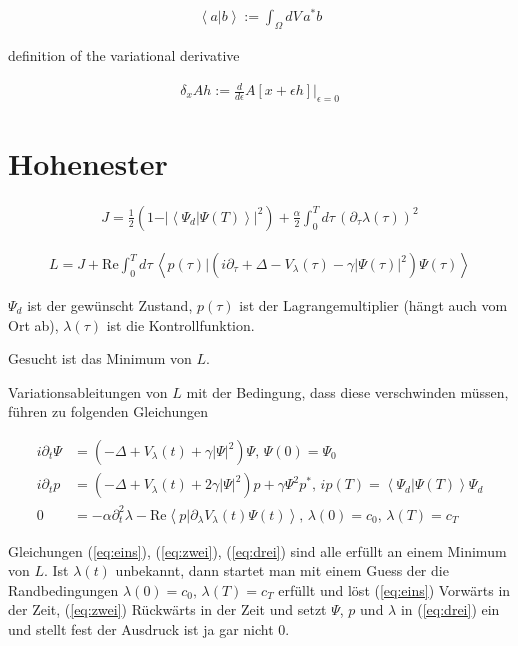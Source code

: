 \documentclass[10pt,a4paper]{article}
\newcommand{\iu}{\ensuremath{i}}
\newcommand{\intT}{\ensuremath{\int_0^T d\tau\,}}
\newcommand{\intV}{\ensuremath{\int_{\Omega} dV\,}}
\newcommand{\skalarprodukt}[2]{\left< #1 \vert #2 \right>}
\begin{document}
\begin{align}
\skalarprodukt{a}{b} := \intV a^* b
\end{align}


definition of the variational derivative

\begin{align}
\delta_x A h := \frac{d}{d\epsilon} A \left[ x+\epsilon h \right] \vert_{\epsilon=0}
\end{align}

\section{Hohenester}

\begin{align}
J = \frac{1}{2} \left(1 - \vert\skalarprodukt{\Psi_d}{\Psi(T)}\vert^2 \right) + \frac{\alpha}{2} \intT \left( \partial_{\tau} \lambda(\tau) \right)^2
\end{align}

\begin{align}
L = J + \text{Re} \intT \skalarprodukt{p(\tau)}{\left( \iu \partial_{\tau} + \Delta - V_{\lambda}(\tau) - \gamma \vert \Psi(\tau) \vert^2 \right)\Psi(\tau)}
\end{align}

$\Psi_d$ ist der gewünscht Zustand, $p(\tau)$ ist der Lagrangemultiplier (hängt auch vom Ort ab), $\lambda(\tau)$ ist die Kontrollfunktion.

Gesucht ist das Minimum von $L$.

Variationsableitungen von $L$ mit der Bedingung, dass diese verschwinden müssen, führen zu folgenden Gleichungen

\begin{subequations}
\begin{align}
\iu \partial_t \Psi &= \left( -\Delta + V_{\lambda}(t) + \gamma \vert \Psi \vert^2 \right) \Psi \text{,  } \Psi(0) = \Psi_0 \label{eq:eins} \\
\iu \partial_t p &= \left( -\Delta + V_{\lambda}(t) + 2 \gamma \vert \Psi \vert^2 \right) p + \gamma \Psi^2 p^* \text{,  } \iu p(T) = \skalarprodukt{\Psi_d}{\Psi(T)} \Psi_d \label{eq:zwei}  \\
0 &= - \alpha \partial_t^2 \lambda -\text{Re} \skalarprodukt{p}{\partial_{\lambda} V_{\lambda}(t) \Psi(t)} \text{,  } \lambda(0)=c_0 \text{, } \lambda(T)=c_T \label{eq:drei}
\end{align}
\end{subequations}

Gleichungen (\ref{eq:eins}), (\ref{eq:zwei}), (\ref{eq:drei}) sind alle erfüllt an einem Minimum von $L$. Ist $\lambda(t)$ unbekannt, dann startet man mit einem Guess der die Randbedingungen  $\lambda(0)=c_0 \text{, } \lambda(T)=c_T$ erfüllt und löst (\ref{eq:eins}) Vorwärts in der Zeit, (\ref{eq:zwei}) Rückwärts in der Zeit und setzt $\Psi$, $p$ und $\lambda$ in (\ref{eq:drei}) ein und stellt fest der Ausdruck ist ja gar nicht 0. 
\end{document}
